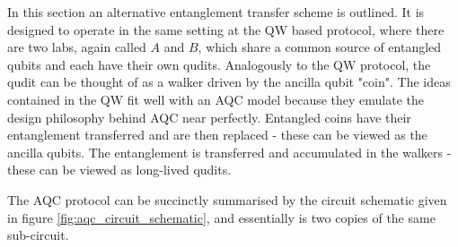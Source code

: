 In this section an alternative entanglement transfer scheme is outlined.
It is designed to operate in the same setting at the QW based protocol, where there are two labs, again called $A$ and $B$, which share a common source of entangled qubits and each have their own qudits.
Analogously to the QW protocol, the qudit can be thought of as a walker driven by the ancilla qubit "coin".
The ideas contained in the QW fit well with an AQC model because they emulate the design philosophy behind AQC near perfectly.
Entangled coins have their entanglement transferred and are then replaced - these can be viewed as the ancilla qubits.
The entanglement is transferred and accumulated in the walkers - these can be viewed as long-lived qudits.

The AQC protocol can be succinctly summarised by the circuit schematic given in figure \ref{fig:aqc_circuit_schematic}, and essentially is two copies of the same sub-circuit.

